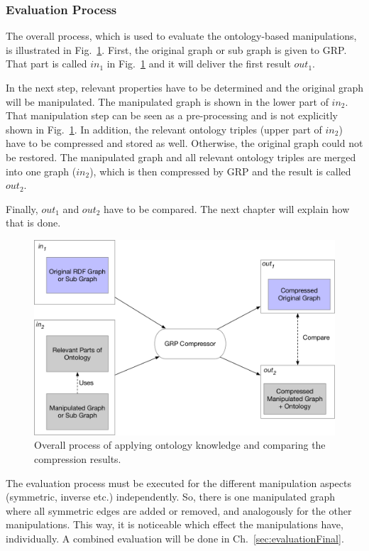 \pagebreak
\subsubsection{Evaluation Process}
The overall process, which is used to evaluate the ontology-based manipulations, is illustrated in Fig.~\ref{fig:overallprocess}. First, the original graph or sub graph is given to GRP. That part is called $in_1$ in Fig.~\ref{fig:overallprocess} and it will deliver the first result $out_1$.

In the next step, relevant properties have to be determined and the original graph will be manipulated. The manipulated graph is shown in the lower part of $in_2$. That manipulation step can be seen as a pre-processing and is not explicitly shown in Fig.~\ref{fig:overallprocess}. In addition, the relevant ontology triples (upper part of $in_2$) have to be compressed and stored as well. Otherwise, the original graph could not be restored. The manipulated graph and all relevant ontology triples are merged into one graph ($in_2$), which is then compressed by GRP and the result is called $out_2$. 

Finally, $out_1$ and $out_2$ have to be compared. The next chapter will explain how that is done.

\begin{figure}
	\centering
	\includegraphics[width=0.8\linewidth]{figures/4_implementation/overallProcess}
	\caption{Overall process of applying ontology knowledge and comparing the compression results.}
	\label{fig:overallprocess}
\end{figure}

The evaluation process must be executed for the different manipulation aspects (symmetric, inverse etc.) independently. So, there is one manipulated graph where all symmetric edges are added or removed, and analogously for the other manipulations. This way, it is noticeable which effect the manipulations have, individually. A combined evaluation will be done in Ch.~\ref{sec:evaluationFinal}.

